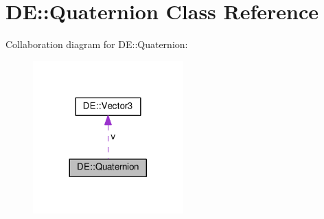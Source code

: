 \hypertarget{classDE_1_1Quaternion}{}\section{DE\+:\+:Quaternion Class Reference}
\label{classDE_1_1Quaternion}


Collaboration diagram for DE\+:\+:Quaternion\+:
\nopagebreak
\begin{figure}[H]
\begin{center}
\leavevmode
\includegraphics[width=164pt]{classDE_1_1Quaternion__coll__graph}
\end{center}
\end{figure}
